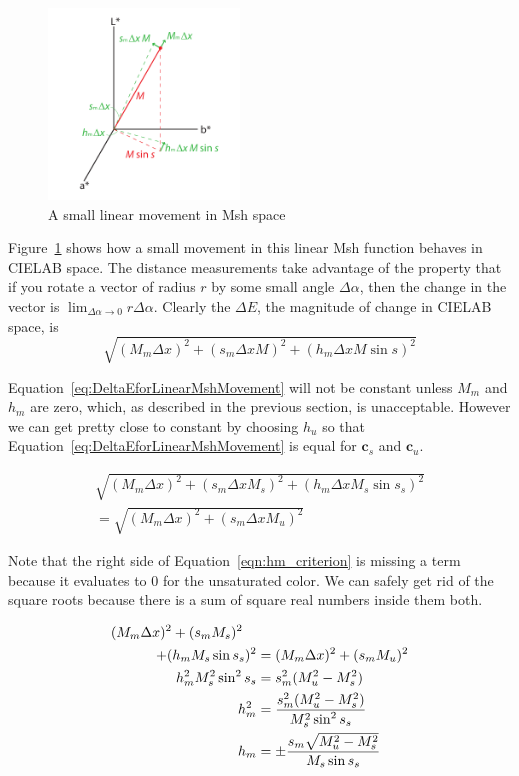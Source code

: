 \documentclass[review,journal]{vgtc}         %
\newcommand{\Lab}{CIELAB\xspace}
\newcommand{\Msh}{Msh\xspace}
\newcommand{\DeltaE}{\ensuremath{\Delta{}E}\xspace}
\newcommand*{\cvec}[1]{\mathbf{#1}}
\begin{document}
\begin{figure}
  \centering
  \includegraphics[height=2in]{images/MshDeltaMovements}
  \caption{A small linear movement in \Msh space}
  \label{sec:LinearMshMovement}
\end{figure}

Figure~\ref{sec:LinearMshMovement} shows how a small movement in this
linear \Msh function behaves in \Lab space.  The distance measurements take
advantage of the property that if you rotate a vector of radius $r$ by some
small angle $\Delta\alpha$, then the change in the vector is
$\lim_{\Delta\alpha \rightarrow 0}r \Delta\alpha$.  Clearly the \DeltaE,
the magnitude of change in \Lab space, is
\begin{equation}
  \sqrt{(M_m \Delta x)^2 + (s_m \Delta x M)^2 + (h_m \Delta x M \sin s)^2}
  \label{eq:DeltaEforLinearMshMovement}
\end{equation}

Equation~\ref{eq:DeltaEforLinearMshMovement} will not be constant unless
$M_m$ and $h_m$ are zero, which, as described in the previous section, is
unacceptable.  However we can get pretty close to constant by choosing
$h_u$ so that Equation~\ref{eq:DeltaEforLinearMshMovement} is equal for
$\cvec{c}_s$ and $\cvec{c}_u$.

\begin{multline}
  \sqrt{(M_m \Delta x)^2 + (s_m \Delta x M_s)^2 + (h_m \Delta x M_s \sin s_s)^2}
  \\ =
  \sqrt{(M_m \Delta x)^2 + (s_m \Delta x M_u)^2}
  \label{eqn:hm_criterion}
\end{multline}

Note that the right side of Equation~\ref{eqn:hm_criterion} is missing a
term because it evaluates to 0 for the unsaturated color.  We can safely
get rid of the square roots because there is a sum of square real numbers
inside them both.

\begin{align}
    (M_m \Delta x)^2 + (s_m M_s)^2 \quad & \notag \\
    + (h_m M_s \sin s_s)^2 &= (M_m \Delta x)^2 + (s_m M_u)^2 \notag \\
    h_m^2 M_s^2 \sin^2 s_s &= s_m^2 (M_u^2 - M_s^2) \notag \\
    h_m^2 &= \frac{s_m^2 (M_u^2 - M_s^2)}{M_s^2 \sin^2 s_s} \notag \\
    h_m &= \pm \frac{s_m \sqrt{M_u^2 - M_s^2}}{M_s \sin s_s}
    \label{eqn:adjusted_hm}
\end{align}
\end{document}

